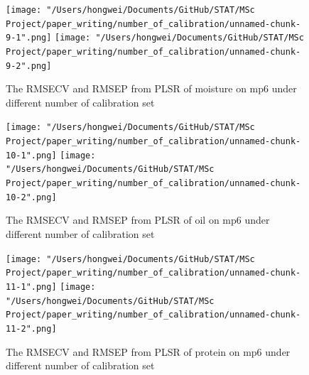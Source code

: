 \documentclass[a4paper,12pt,titlepage]{article} %
\numberwithin{equation}{section}  %
\begin{document}
\begin{appendices}
			\begin{figure}[h]    %
	\centering           %
	\texttt{[image: "/Users/hongwei/Documents/GitHub/STAT/MSc Project/paper\_writing/number\_of\_calibration/unnamed-chunk-9-1".png]}  %
	\texttt{[image: "/Users/hongwei/Documents/GitHub/STAT/MSc Project/paper\_writing/number\_of\_calibration/unnamed-chunk-9-2".png]}  %
	\caption{The RMSECV and RMSEP from PLSR of moisture on mp6 under different number of calibration set}          %
	\label{fig:calibration_9-1}               %
\end{figure}                        %


			\begin{figure}[h]    %
	\centering           %
	\texttt{[image: "/Users/hongwei/Documents/GitHub/STAT/MSc Project/paper\_writing/number\_of\_calibration/unnamed-chunk-10-1".png]}  %
	\texttt{[image: "/Users/hongwei/Documents/GitHub/STAT/MSc Project/paper\_writing/number\_of\_calibration/unnamed-chunk-10-2".png]}  %
	\caption{The RMSECV and RMSEP from PLSR of oil on mp6 under different number of calibration set}          %
	\label{fig:calibration_10-1}               %
\end{figure}                        %



			\begin{figure}[h]    %
	\centering           %
	\texttt{[image: "/Users/hongwei/Documents/GitHub/STAT/MSc Project/paper\_writing/number\_of\_calibration/unnamed-chunk-11-1".png]}  %
	\texttt{[image: "/Users/hongwei/Documents/GitHub/STAT/MSc Project/paper\_writing/number\_of\_calibration/unnamed-chunk-11-2".png]}  %
	\caption{The RMSECV and RMSEP from PLSR of protein on mp6 under different number of calibration set}          %
	\label{fig:calibration_11-1}               %
\end{figure}                        %



\end{appendices}
\end{document}
